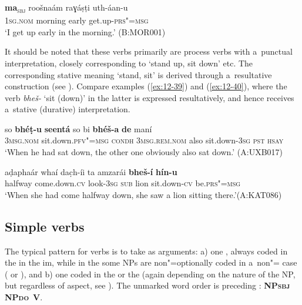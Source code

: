 \begin{exe}
\ex
\label{ex:12-38}
\gll {\ob}\textbf{ma}{\cb}\textsubscript{\textsc{\upshape sbj}} roošnaám raɣáṣṭi uth-áan-u  \\
1\textsc{sg.nom} morning early get.up-\textsc{prs"=msg} \\
\glt `I get up early in the morning.' (B:MOR001)
\end{exe}

It should be noted that these verbs primarily are process verbs with a~punctual interpretation, closely corresponding to \iliEnglish `stand up, sit down' etc. The corresponding stative meaning `stand, sit' is derived through a~resultative construction (see ). Compare examples (\ref{ex:12-39}) and (\ref{ex:12-40}), where the verb \textit{bheš-} `sit (down)' in the latter is expressed resultatively, and hence receives a~stative (durative) interpretation.

\begin{exe}
\ex
\label{ex:12-39}
\gll so \textbf{bhéṭ-u} \textbf{seentá} so bi \textbf{bhéš-a} \textbf{de} maní \\
\textsc{3msg.nom} sit.down.\textsc{pfv"=msg} \textsc{condh} \textsc{3msg.rem.nom} also  sit.down-\textsc{3sg} \textsc{pst } \textsc{hsay} \\
\glt `When he had sat down, the other one obviously also sat down.' (A:UXB017)

\ex
\label{ex:12-40}
\gll aḍaphaár whaí dac̣h-íi ta amzarái \textbf{bheš-í} \textbf{hín-u} \\
halfway come.down.\textsc{cv} look-\textsc{3sg } \textsc{sub} lion sit.down-\textsc{cv} be.\textsc{prs"=msg} \\
\glt `When she had come halfway down, she saw a lion sitting there.'\newline (A:KAT086)
\end{exe}

\subsection{Simple  verbs}
\label{subsec:12-2-3}


The typical pattern for  verbs is to take as arguments: a) one   , always coded in the  in the im, while in the  some NPs are non"=optionally coded in a~non"= case ( or ), and b) one    coded in the  or the  (again depending on the nature of the NP, but regardless of aspect, see ). The unmarked word order is  preceding : \textbf{NP\textsc{sbj}} \textbf{NP\textsc{do}}~\textbf{V}.


